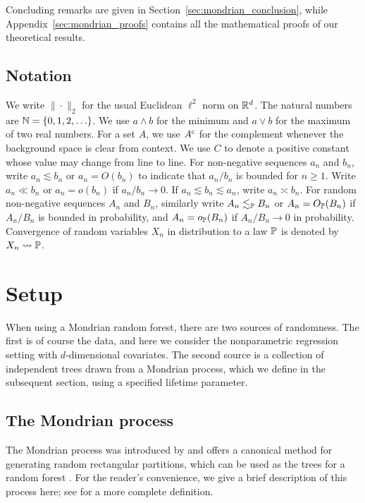 Concluding remarks are given in Section~\ref{sec:mondrian_conclusion},
while Appendix~\ref{sec:mondrian_proofs} contains all the mathematical
proofs of our theoretical results.

\subsection{Notation}

We write $\|\cdot\|_2$ for the usual Euclidean $\ell^2$ norm on $\R^d$.
The natural numbers are $\N = \{0, 1, 2, \ldots \}$.
We use $a \wedge b$ for the minimum and $a \vee b$ for the maximum
of two real numbers.
For a set $A$, we use $A^\c$ for the complement
whenever the background space is clear from context.
We use $C$ to denote a positive constant whose value may change
from line to line.
For non-negative sequences
$a_n$ and $b_n$, write
$a_n \lesssim b_n$ or $a_n = O(b_n)$
to indicate that
$a_n / b_n$ is bounded for $n\geq 1$.
Write $a_n \ll b_n$ or $a_n = o(b_n)$ if $a_n / b_n \to 0$.
If $a_n \lesssim b_n \lesssim a_n$,
write $a_n \asymp b_n$.
For random non-negative sequences
$A_n$ and $B_n$, similarly write
$A_n \lesssim_\P B_n$ or $A_n = O_\P(B_n)$ if
$A_n / B_n$ is bounded in probability,
and $A_n = o_\P(B_n)$ if $A_n / B_n \to 0$ in probability.
Convergence of random variables $X_n$ in distribution to a law $\P$
is denoted by $X_n \rightsquigarrow \P$.

\section{Setup}
\label{sec:mondrian_setup}

When using a Mondrian random forest, there are two sources of randomness.
The first is of course the data,
and here we consider the nonparametric regression setting
with $d$-dimensional covariates.
The second source is a collection of
independent trees drawn from a Mondrian process,
which we define in the subsequent section,
using a specified lifetime parameter.

\subsection{The Mondrian process}

The Mondrian process was introduced by
\citet{roy2008mondrian} and offers a canonical method
for generating random rectangular partitions,
which can be used as the trees for a random forest
\citep{lakshminarayanan2014mondrian}.
For the reader's convenience, we give a brief description of this process
here; see \citet[Section~3]{mourtada2020minimax}
for a more complete definition.

